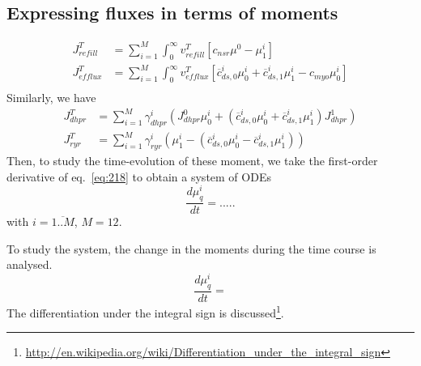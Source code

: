 \subsection{Expressing fluxes in terms of moments}
\label{sec:expr-flux-terms}

\begin{equation}
  \label{eq:236}
  \begin{split}
    J^T_{refill} &= \sum_{i=1}^M \int_0^\infty v^T_{refill}
    [c_{nsr}\mu^0 - \mu^i_1 ] \\
    J^T_{efflux} &= \sum_{i=1}^M \int_0^\infty v^T_{efflux} [\overline{c}^i_{ds,0} \mu^i_0+ \overline{c}^i_{ds,1} \mu^i_1   -
    c_{myo} \mu^i_0] \\
  \end{split}
\end{equation}
Similarly, we have
\begin{equation}
  \label{eq:237}
  \begin{split}
    J^T_{dhpr} &= \sum_{i=1}^M  \gamma^i_{dhpr} (J^{0}_{dhpr}\mu^i_0 +
    (\overline{c}^i_{ds,0} \mu^i_0 + \overline{c}^i_{ds,1} \mu^i_1)
    J^{1}_{dhpr}) \\
    J^T_{ryr} &= \sum_{i=1}^M  \gamma^i_{ryr} (\mu^i_1 -
    (\overline{c}^i_{ds,0} \mu^i_0 - \overline{c}^i_{ds,1} \mu^i_1))
  \end{split}
\end{equation}
Then, to study the time-evolution of these moment, we take the
first-order derivative of eq.~\eqref{eq:218} to obtain a system of ODEs
\begin{equation}
  \label{eq:238}
  \frac{d\mu^i_q}{dt} = .....
\end{equation}
with $i=\overline{1..M}$, $M=12$.

To study the system, the change in the moments during the time course
is analysed. 
\begin{equation}
  \label{eq:252}
  \frac{d\mu^i_q}{dt} = 
\end{equation}
The differentiation under the integral sign is discussed\footnote{\url{http://en.wikipedia.org/wiki/Differentiation_under_the_integral_sign}}.

